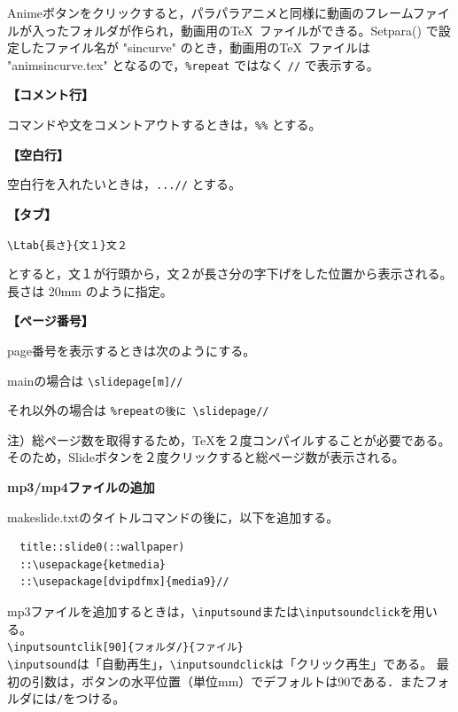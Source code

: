 \documentclass[papersize,a4paper,12pt,uplatex]{jsarticle}
\begin{document}
Animeボタンをクリックすると，パラパラアニメと同様に動画のフレームファイルが入ったフォルダが作られ，動画用の\TeX\ ファイルができる。Setpara() で設定したファイル名が "sincurve" のとき，動画用の\TeX\ ファイルは "animsincurve.tex" となるので，\verb|%repeat| ではなく \verb|//| で表示する。

 
\vspace{\baselineskip}
{\bf 【コメント行】} 

 コマンドや文をコメントアウトするときは，\verb|%%| とする。

\vspace{\baselineskip}
{\bf 【空白行】}

空白行を入れたいときは，\verb|...//| とする。

\vspace{\baselineskip}
{\bf 【タブ】}

\hspace{10mm}\verb|\Ltab{長さ}{文１}文２|

とすると，文１が行頭から，文２が長さ分の字下げをした位置から表示される。長さは 20mm のように指定。

\vspace{\baselineskip}
{\bf 【ページ番号】}

page番号を表示するときは次のようにする。
 
 mainの場合は \verb|\slidepage[m]//|
 
それ以外の場合は \verb|%repeatの後に \slidepage//|
 
 注）総ページ数を取得するため，TeXを２度コンパイルすることが必要である。そのため，Slideボタンを２度クリックすると総ページ数が表示される。

\vspace{\baselineskip}
{\bf mp3/mp4ファイルの追加}

makeslide.txtのタイトルコマンドの後に，以下を追加する。
\begin{verbatim}
  title::slide0(::wallpaper)
  ::\usepackage{ketmedia}
  ::\usepackage[dvipdfmx]{media9}//
\end{verbatim}

mp3ファイルを追加するときは，\verb|\inputsound|または\verb|\inputsoundclick|を用いる。\\
\hspace{10mm}\verb|\inputsountclik[90]{フォルダ/}{ファイル}|\\
\verb|\inputsound|は「自動再生」，\verb|\inputsoundclick|は「クリック再生」である。
最初の引数は，ボタンの水平位置（単位mm）でデフォルトは90である．またフォルダには\verb|/|をつける。\vspace{2mm}
\end{document}
